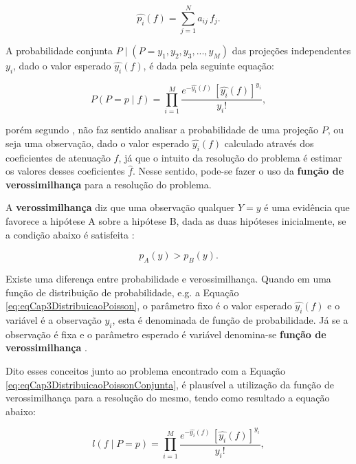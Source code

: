 {{\begin{equation}
\hat{p_{i}}(f) = \sum_{j=1}^{N} a_{ij} \, f_{j}.
\label{eq:eqCap3BeerEsperancaAtenuacao}
\end{equation}

A probabilidade conjunta $P \mid (P = {y_{1},y_{2},y_{3},...,y_{M}})$ das projeções independentes $y_{i}$, dado o valor esperado $\hat{y_{i}}(f)$, é dada pela seguinte equação:   

\begin{equation}
P(P = p\mid f ) = \prod_{i=1}^{M}  \dfrac{e^{-\hat{y_{i}}(f)} \, [\hat{y_{i}}(f)]^{y_{i}}}  {y_{i}!},
\label{eq:eqCap3DistribuicaoPoissonConjunta}
\end{equation}

\noindent porém segundo , não faz sentido analisar a probabilidade de uma projeção $P$, ou seja uma observação, dado o valor esperado $\hat{y_{i}}(f)$ calculado através dos coeficientes de atenuação $f$, já que o intuito da resolução do problema é estimar os valores desses coeficientes $\hat{f}$. Nesse sentido, pode-se fazer o uso da \textbf{função de verossimilhança} para a resolução do problema.

A \textbf{verossimilhança} diz que uma observação qualquer $Y = y$ é uma evidência que favorece a hipótese A sobre a hipótese B, dada as duas hipóteses inicialmente, se a condição abaixo é satisfeita \cite{morettin2010}:

\begin{equation}
p_{A}(y) >p_{B}(y).
\label{eq:eqCap3LeiVerossimilhanca}
\end{equation}

Existe uma diferença entre probabilidade e verossimilhança. Quando em uma função de distribuição de probabilidade, e.g. a Equação \ref{eq:eqCap3DistribuicaoPoisson}, o parâmetro fixo é o valor esperado $\hat{y_{i}}(f)$ e o variável é a observação $y_{i}$, esta é denominada de função de probabilidade. Já se a observação é fixa e o parâmetro esperado é variável denomina-se \textbf{função de verossimilhança} \cite{morettin2010}.

Dito esses conceitos junto ao problema encontrado com a Equação \ref{eq:eqCap3DistribuicaoPoissonConjunta}, é plausível a utilização da função de verossimilhança para a resolução do mesmo, tendo como resultado a equação abaixo: 

\begin{equation}
l(f \mid P = p) = \prod_{i=1}^{M}  \dfrac{e^{-\hat{y_{i}}(f)} \, [\hat{y_{i}}(f)]^{y_{i}}}  {y_{i}!},
\label{eq:eqCap3DistribuicaoPoissonConjuntaVerossimilhanca1}
\end{equation} 
  
}}
